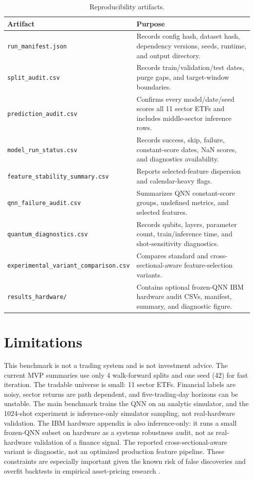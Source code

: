 \documentclass[11pt]{article}
\begin{document}
\begin{table}[H]
\centering
\small
\caption{Reproducibility artifacts.}
\begin{tabularx}{\textwidth}{@{}lX@{}}
\toprule
\textbf{Artifact} & \textbf{Purpose} \\
\midrule
\texttt{run\_manifest.json} & Records config hash, dataset hash, dependency versions, seeds, runtime, and output directory. \\
\texttt{split\_audit.csv} & Records train/validation/test dates, purge gaps, and target-window boundaries. \\
\texttt{prediction\_audit.csv} & Confirms every model/date/seed scores all 11 sector ETFs and includes middle-sector inference rows. \\
\texttt{model\_run\_status.csv} & Records success, skip, failure, constant-score dates, NaN scores, and diagnostics availability. \\
\texttt{feature\_stability\_summary.csv} & Reports selected-feature dispersion and calendar-heavy flags. \\
\texttt{qnn\_failure\_audit.csv} & Summarizes QNN constant-score groups, undefined metrics, and selected features. \\
\texttt{quantum\_diagnostics.csv} & Records qubits, layers, parameter count, train/inference time, and shot-sensitivity diagnostics. \\
\texttt{experimental\_variant\_comparison.csv} & Compares standard and cross-sectional-aware feature-selection variants. \\
\texttt{results\_hardware/} & Contains optional frozen-QNN IBM hardware audit CSVs, manifest, summary, and diagnostic figure. \\
\bottomrule
\end{tabularx}
\end{table}

\section{Limitations}

This benchmark is not a trading system and is not investment advice. The current MVP summaries use only 4 walk-forward splits and one seed (42) for fast iteration. The tradable universe is small: 11 sector ETFs. Financial labels are noisy, sector returns are path dependent, and five-trading-day horizons can be unstable. The main benchmark trains the QNN on an analytic simulator, and the 1024-shot experiment is inference-only simulator sampling, not real-hardware validation. The IBM hardware appendix is also inference-only: it runs a small frozen-QNN subset on hardware as a systems robustness audit, not as real-hardware validation of a finance signal. The reported cross-sectional-aware variant is diagnostic, not an optimized production feature pipeline. These constraints are especially important given the known risk of false discoveries and overfit backtests in empirical asset-pricing research \cite{white2000reality,bailey2017pbo,harvey2016crosssection}.
\end{document}
